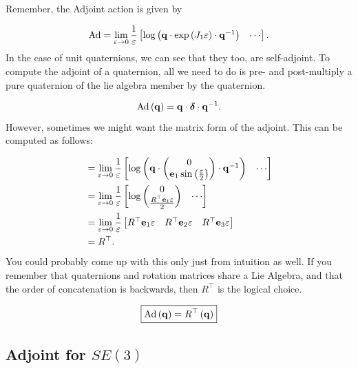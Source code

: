 Remember, the Adjoint action is given by 

\[
\textnormal{Ad}=\lim_{\varepsilon\to0}\frac{1}{\varepsilon}\begin{bmatrix}\log\left(\mathbf{q}\cdot\exp\left(J_{1}\varepsilon\right)\cdot\mathbf{q}^{-1}\right) & \cdots\end{bmatrix}.
\]
In the case of unit quaternions, we can see that they too, are self-adjoint.
To compute the adjoint of a quaternion, all we need to do is pre-
and post-multiply a pure quaternion of the lie algebra member by the
quaternion. 

\[
\textnormal{Ad}\left(\mathbf{q}\right)=\mathbf{q}\cdot\boldsymbol{\delta}\cdot\mathbf{q}^{-1}.
\]
However, sometimes we might want the matrix form of the adjoint. This
can be computed as follows:

\begin{align*}
 & =\lim_{\varepsilon\to 0}\frac{1}{\varepsilon}\begin{bmatrix}\log\left(\mathbf{q}\cdot\begin{pmatrix}0\\
\mathbf{e}_{1}\sin\left(\frac{\varepsilon}{2}\right)
\end{pmatrix}\cdot\mathbf{q}^{-1}\right) & \cdots\end{bmatrix}\\
 & =\lim_{\varepsilon\to 0}\frac{1}{\varepsilon}\begin{bmatrix}\log\begin{pmatrix}0\\
\frac{R^{\top}\mathbf{e}_{1}\varepsilon}{2}
\end{pmatrix} & \cdots\end{bmatrix}\\
 & =\lim_{\varepsilon\to 0}\frac{1}{\varepsilon}\begin{bmatrix}R^{\top}\mathbf{e}_{1}\varepsilon & R^{\top}\mathbf{e}_{2}\varepsilon & R^{\top}\mathbf{e}_{3}\varepsilon\end{bmatrix}\\
 & =R^{\top}.
\end{align*}
You could probably come up with this only just from intuition as well.
If you remember that quaternions and rotation matrices share a Lie
Algebra, and that the order of concatenation is backwards, then $R^{\top}$
is the logical choice.

\[
\boxed{\textnormal{Ad}\left(\mathbf{q}\right)=R^{\top}\left(\mathbf{q}\right)}
\]


\subsection{Adjoint for $SE(3)$}

